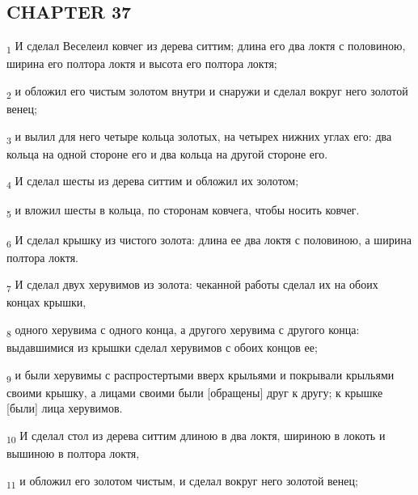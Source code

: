 \subsection{CHAPTER 37}
\begin{tcolorbox}
\textsubscript{1} И сделал Веселеил ковчег из дерева ситтим; длина его два локтя с половиною, ширина его полтора локтя и высота его полтора локтя;
\end{tcolorbox}
\begin{tcolorbox}
\textsubscript{2} и обложил его чистым золотом внутри и снаружи и сделал вокруг него золотой венец;
\end{tcolorbox}
\begin{tcolorbox}
\textsubscript{3} и вылил для него четыре кольца золотых, на четырех нижних углах его: два кольца на одной стороне его и два кольца на другой стороне его.
\end{tcolorbox}
\begin{tcolorbox}
\textsubscript{4} И сделал шесты из дерева ситтим и обложил их золотом;
\end{tcolorbox}
\begin{tcolorbox}
\textsubscript{5} и вложил шесты в кольца, по сторонам ковчега, чтобы носить ковчег.
\end{tcolorbox}
\begin{tcolorbox}
\textsubscript{6} И сделал крышку из чистого золота: длина ее два локтя с половиною, а ширина полтора локтя.
\end{tcolorbox}
\begin{tcolorbox}
\textsubscript{7} И сделал двух херувимов из золота: чеканной работы сделал их на обоих концах крышки,
\end{tcolorbox}
\begin{tcolorbox}
\textsubscript{8} одного херувима с одного конца, а другого херувима с другого конца: выдавшимися из крышки сделал херувимов с обоих концов ее;
\end{tcolorbox}
\begin{tcolorbox}
\textsubscript{9} и были херувимы с распростертыми вверх крыльями и покрывали крыльями своими крышку, а лицами своими были [обращены] друг к другу; к крышке [были] лица херувимов.
\end{tcolorbox}
\begin{tcolorbox}
\textsubscript{10} И сделал стол из дерева ситтим длиною в два локтя, шириною в локоть и вышиною в полтора локтя,
\end{tcolorbox}
\begin{tcolorbox}
\textsubscript{11} и обложил его золотом чистым, и сделал вокруг него золотой венец;
\end{tcolorbox}
